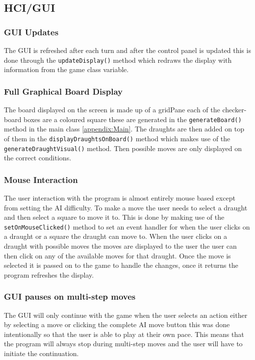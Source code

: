 \documentclass[a4paper,12pt]{scrartcl}
\begin{document}
{		\subsection{HCI/GUI}
		{
			\subsubsection{GUI Updates}{The GUI is refreshed after each turn and after the control panel is updated this is done through the \lstinline|updateDisplay()| method which redraws the display with information from the game class variable.}
			\subsubsection{Full Graphical Board Display}{
				The board displayed on the screen is made up of a gridPane each of the checker-board boxes are a coloured square these are generated in the \lstinline|generateBoard()| method in the main class \cref{appendix:Main}. The draughts are then added on top of them in the \lstinline|displayDraughtsOnBoard()| method which makes use of the \lstinline|generateDraughtVisual()| method. Then possible moves are only displayed on the correct conditions.}
			\subsubsection{Mouse Interaction}{
				The user interaction with the program is almost entirely mouse based except from setting the AI difficulty. To make a move the user needs to select a draught and then select a square to move it to. 
				This is done by making use of the \lstinline|setOnMouseClicked()| method to set an event handler for when the user clicks on a draught or a square the draught can move to. When the user clicks on a draught with possible moves the moves are displayed to the user the user can then click on any of the available moves for that draught. Once the move is selected it is passed on to the game to handle the changes, once it returns the program refreshes the display.
			}
			\subsubsection{GUI pauses on multi-step moves}{
				The GUI will only continue with the game when the user selects an action either by selecting a move or clicking the complete AI move button this was done intentionally so that the user is able to play at their own pace. This means that the program will always stop during multi-step moves and the user will have to initiate the continuation.
			}
}}
\end{document}
